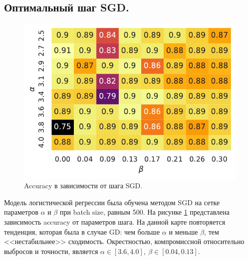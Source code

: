 \documentclass[12pt]{extarticle}
\begin{document}
\subsection{Оптимальный шаг SGD.}

\begin{figure}
\centering
    \vspace{-12mm}
    \includegraphics[width=1\linewidth]{pics/accur_step_stoch.pdf}
    \vspace{-8mm}
    \caption{Accuracy в зависимости от шага SGD.}
    \label{fig:accur_step_stoch}
\end{figure}
Модель логистической регрессии была обучена методом SGD на сетке параметров $\alpha$ и $\beta$ при batch size, равным 500. На рисунке \ref{fig:accur_step_stoch} представлена зависимость accuracy от параметров шага. На данной карте повторяется тенденция, которая была в случае GD: чем больше $\alpha$ и меньше $\beta$, тем <<нестабильнее>> сходимость. Окрестностью, компромиссной относительно выбросов и точности, является $\alpha\in[3.6, 4.0],\ \beta\in[0.04, 0.13]$. 

\end{document}
